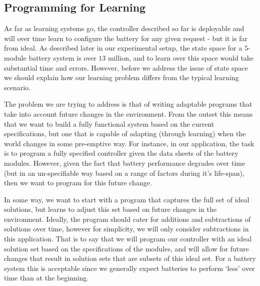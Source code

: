 \subsection{Programming for Learning}\label{subsec:constraints}

As far as learning systems go, the controller described so far is deployable and will over time learn to configure the battery for any given request - but it is far from ideal. As described later in our experimental setup, the state space for a $5$-module battery system is over $13$ million, and to learn over this space would take substantial time and errors. However, before we address the issue of state space we should explain how our learning problem differs from the typical learning scenario.

The problem we are trying to address is that of writing adaptable programs that take into account future changes in the environment. From the outset this means that we want to build a fully functional system based on the current specifications, but one that is capable of adapting (through learning) when the world changes in some pre-emptive way. For instance, in our application, the task is to program a fully specified controller given the data sheets of the battery modules. However, given the fact that battery performance degrades over time (but in an un-specifiable way based on a range of factors during it's life-span), then we want to program for this future change. 

In some way, we want to start with a program that captures the full set of ideal solutions, but learns to adjust this set based on future changes in the environment. Ideally, the program should cater for additions and subtractions of solutions over time, however for simplicity, we will only consider subtractions in this application. That is to say that we will program our controller with an ideal solution set based on the specifications of the modules, and will allow for future changes that result in solution sets that are subsets of this ideal set. For a battery system this is acceptable since we generally expect batteries to perform `less' over time than at the beginning.

